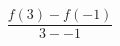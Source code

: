 \documentclass[preview]{standalone}
\begin{document}
\begin{align*}
\dfrac{f(3) - f(-1)}{3 - -1}
\end{align*}
\end{document}

